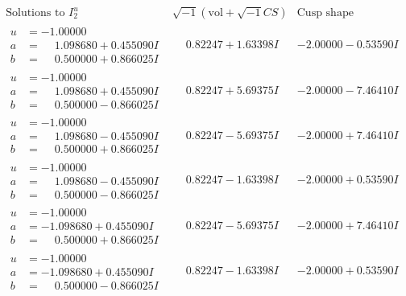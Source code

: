 \documentclass[1p]{elsarticle_modified}
\theoremstyle{definition}
\newcommand{\I}{\sqrt{-1}}
\begin{document}
$$\begin{array}{c|c|c}  
\text{Solutions to }I^u_{2}& \I (\text{vol} + \sqrt{-1}CS) & \text{Cusp shape}\\
 \hline 
\begin{aligned}
u &= -1.00000\phantom{ +0.000000I} \\
a &= \phantom{-}1.098680 + 0.455090 I \\
b &= \phantom{-}0.500000 + 0.866025 I\end{aligned}
 & \phantom{-}0.82247 + 1.63398 I & -2.00000 - 0.53590 I \\ \hline\begin{aligned}
u &= -1.00000\phantom{ +0.000000I} \\
a &= \phantom{-}1.098680 + 0.455090 I \\
b &= \phantom{-}0.500000 - 0.866025 I\end{aligned}
 & \phantom{-}0.82247 + 5.69375 I & -2.00000 - 7.46410 I \\ \hline\begin{aligned}
u &= -1.00000\phantom{ +0.000000I} \\
a &= \phantom{-}1.098680 - 0.455090 I \\
b &= \phantom{-}0.500000 + 0.866025 I\end{aligned}
 & \phantom{-}0.82247 - 5.69375 I & -2.00000 + 7.46410 I \\ \hline\begin{aligned}
u &= -1.00000\phantom{ +0.000000I} \\
a &= \phantom{-}1.098680 - 0.455090 I \\
b &= \phantom{-}0.500000 - 0.866025 I\end{aligned}
 & \phantom{-}0.82247 - 1.63398 I & -2.00000 + 0.53590 I \\ \hline\begin{aligned}
u &= -1.00000\phantom{ +0.000000I} \\
a &= -1.098680 + 0.455090 I \\
b &= \phantom{-}0.500000 + 0.866025 I\end{aligned}
 & \phantom{-}0.82247 - 5.69375 I & -2.00000 + 7.46410 I \\ \hline\begin{aligned}
u &= -1.00000\phantom{ +0.000000I} \\
a &= -1.098680 + 0.455090 I \\
b &= \phantom{-}0.500000 - 0.866025 I\end{aligned}
 & \phantom{-}0.82247 - 1.63398 I & -2.00000 + 0.53590 I \\ \hline\begin{aligned}

\end{aligned}
\end{array}$$
\end{document}
